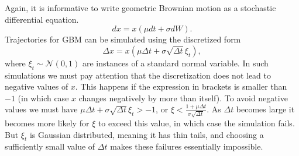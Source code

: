 \documentclass[a4paper]{article}
\newcommand{\elabel}[1]{\label{eq:#1}}
\newcommand{\be}{\begin{equation}}
\newcommand{\ee}{\end{equation}}
\begin{document}
Again, it is informative to write geometric Brownian motion as a stochastic differential equation. 
\be
dx=x(\mu dt+ \sigma dW).
\elabel{GBM_c}
\ee
Trajectories for GBM can be simulated using the discretized form
\be
\Delta x=x(\mu \Delta t+ \sigma \sqrt{\Delta t} \xi_t),
\elabel{GBM_d}
\ee
where $\xi_t \sim \mathcal{N}(0,1)$ are instances of a standard normal variable. In such simulations
we must pay attention that the discretization does not lead to negative values of $x$. This 
happens if the expression in brackets is smaller than $-1$ (in which case $x$ changes negatively by more than itself).
To avoid negative values we must have $\mu \Delta t + \sigma \sqrt{\Delta t} \xi_t>-1$, or 
$\xi <\frac{1+\mu\Delta t}{\sigma \sqrt{\Delta t}}$. As $\Delta t$ becomes large it becomes more likely for
$\xi$ to exceed this value, in which case the simulation fails. But $\xi_t$ is Gaussian distributed, meaning
it has thin tails, and choosing a sufficiently small value of $\Delta t$ makes these failures essentially impossible.
\end{document}
